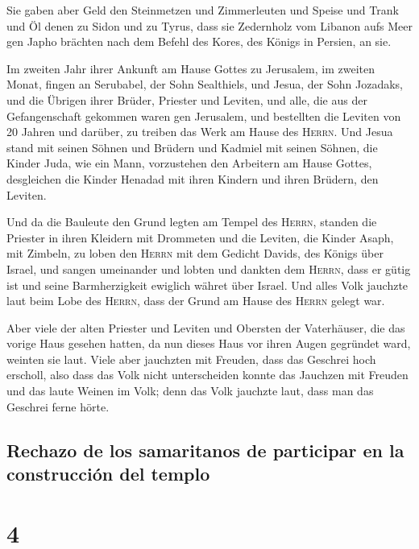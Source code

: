  Sie gaben aber Geld den Steinmetzen und Zimmerleuten und
Speise und Trank und Öl denen zu Sidon und zu Tyrus, dass sie Zedernholz
vom Libanon aufs Meer gen Japho brächten nach dem Befehl des Kores, des
Königs in Persien, an sie.

 Im zweiten Jahr ihrer Ankunft am Hause Gottes zu
Jerusalem, im zweiten Monat, fingen an Serubabel, der Sohn Sealthiels,
und Jesua, der Sohn Jozadaks, und die Übrigen ihrer Brüder, Priester und
Leviten, und alle, die aus der Gefangenschaft gekommen waren gen
Jerusalem, und bestellten die Leviten von 20 Jahren und darüber, zu
treiben das Werk am Hause des \textsc{Herrn}.  Und Jesua
stand mit seinen Söhnen und Brüdern und Kadmiel mit seinen Söhnen, die
Kinder Juda, wie ein Mann, vorzustehen den Arbeitern am Hause Gottes,
desgleichen die Kinder Henadad mit ihren Kindern und ihren Brüdern, den
Leviten.

 Und da die Bauleute den Grund legten am Tempel des
\textsc{Herrn}, standen die Priester in ihren Kleidern mit Drommeten und
die Leviten, die Kinder Asaph, mit Zimbeln, zu loben den \textsc{Herrn}
mit dem Gedicht Davids, des Königs über Israel,  und
sangen umeinander und lobten und dankten dem \textsc{Herrn}, dass er
gütig ist und seine Barmherzigkeit ewiglich währet über Israel. Und
alles Volk jauchzte laut beim Lobe des \textsc{Herrn}, dass der Grund am
Hause des \textsc{Herrn} gelegt war.

 Aber viele der alten Priester und Leviten und Obersten
der Vaterhäuser, die das vorige Haus gesehen hatten, da nun dieses Haus
vor ihren Augen gegründet ward, weinten sie laut. Viele aber jauchzten
mit Freuden, dass das Geschrei hoch erscholl,  also dass
das Volk nicht unterscheiden konnte das Jauchzen mit Freuden und das
laute Weinen im Volk; denn das Volk jauchzte laut, dass man das Geschrei
ferne hörte.

\hypertarget{rechazo-de-los-samaritanos-de-participar-en-la-construcciuxf3n-del-templo}{%
\subsection{Rechazo de los samaritanos de participar en la construcción
del
templo}\label{rechazo-de-los-samaritanos-de-participar-en-la-construcciuxf3n-del-templo}}

\hypertarget{section-3}{%
\section{4}\label{section-3}}

